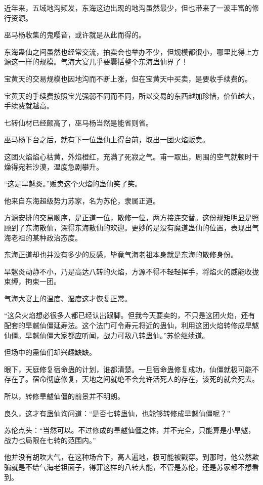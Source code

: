 \begin{this_body}
近年来，五域地沟频发，东海这边出现的地沟虽然最少，但也带来了一波丰富的修行资源。

巫马杨收集的鬼嘤音，或许就是从此而得的。

东海蛊仙之间虽然也经常交流，拍卖会也举办不少，但规模都很小，哪里比得上方源这一样的规模。气海大宴几乎要囊括整个东海蛊仙界了！

宝黄天的交易规模也因地沟而不断上涨，但在宝黄天中买卖，是要收手续费的。

宝黄天的手续费按照宝光强弱不同而不同，所以交易的东西越加珍惜，价值越大，手续费就越高。

七转仙材已经颇高了，巫马杨当然是能省则省。

巫马杨下台之后，就有下一位蛊仙上得台前，取出一团火焰贩卖。

这团火焰焰心枯黄，外焰橙红，充满了死寂之气。甫一取出，周围的空气就顿时干燥得宛若沙漠，温度急剧攀升。

“这是旱魃炎。”贩卖这个火焰的蛊仙笑了笑。

他来自东海超级势力苏家，名为苏伦，隶属正道。

方源安排的交易顺序，是正道一位，散修一位，两方接连交替。这份规矩明显是照顾到了东海散仙，深得东海散仙的欢迎。更妙的是没有魔道蛊仙的位置，表现出气海老祖的某种政治态度。

东海正道却也并没有多少的反感，毕竟气海老祖本身就是东海的散修身份。

旱魃炎动静不小，乃是高达八转的火焰，方源不得不轻轻挥手，将焰火的威能收拢束缚，拘束一团。

气海大宴上的温度、湿度这才恢复正常。

“这朵火焰想必很多人都已经认出跟脚。但我今天要卖的，不只是这团火焰，还有配套的旱魃仙僵延寿法。这个法门可令寿元将近的蛊仙，利用这团火焰转修成旱魃仙僵。旱魃仙僵大家都应听闻，战力可敌八转蛊仙。”苏伦继续道。

但场中的蛊仙们却兴趣缺缺。

眼下，天庭修复宿命蛊的计划，谁都清楚。一旦宿命蛊修复成功，仙僵就极可能不存在了。宿命彻底修复，天地之间就绝不会允许活死人的存在，该死的就会死去。

所以，转修旱魃仙僵的前景并不明朗。

良久，这才有蛊仙询问道：“是否七转蛊仙，也能够转修成旱魃仙僵呢？”

苏伦点头：“当然可以。不过修成的旱魃仙僵之体，并不完全，只能算是小旱魃，战力也局限在七转的范围内。”

他并没有胡吹大气，在这种场合下，高人遍地，极可能被戳穿。到那时，他公然欺骗就是不给气海老祖面子，得罪这样的八转大能，不管是苏伦，还是苏家都不想看到。


\end{this_body}
